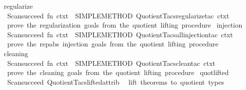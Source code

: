 \begin{isabellebody}
\isanewline
{}\isamarkupfalse%
\ regularize\ {\isacharequal}{\kern0pt}\isanewline
\ \ {\isacartoucheopen}Scan{\isachardot}{\kern0pt}succeed\ {\isacharparenleft}{\kern0pt}fn\ ctxt\ {\isacharequal}{\kern0pt}{\isachargreater}{\kern0pt}\ SIMPLE{\isacharunderscore}{\kern0pt}METHOD{\isacharprime}{\kern0pt}\ {\isacharparenleft}{\kern0pt}Quotient{\isacharunderscore}{\kern0pt}Tacs{\isachardot}{\kern0pt}regularize{\isacharunderscore}{\kern0pt}tac\ ctxt{\isacharparenright}{\kern0pt}{\isacharparenright}{\kern0pt}{\isacartoucheclose}\isanewline
\ \ {\isacartoucheopen}prove\ the\ regularization\ goals\ from\ the\ quotient\ lifting\ procedure{\isacartoucheclose}\isanewline
\isanewline
{}\isamarkupfalse%
\ injection\ {\isacharequal}{\kern0pt}\isanewline
\ \ {\isacartoucheopen}Scan{\isachardot}{\kern0pt}succeed\ {\isacharparenleft}{\kern0pt}fn\ ctxt\ {\isacharequal}{\kern0pt}{\isachargreater}{\kern0pt}\ SIMPLE{\isacharunderscore}{\kern0pt}METHOD{\isacharprime}{\kern0pt}\ {\isacharparenleft}{\kern0pt}Quotient{\isacharunderscore}{\kern0pt}Tacs{\isachardot}{\kern0pt}all{\isacharunderscore}{\kern0pt}injection{\isacharunderscore}{\kern0pt}tac\ ctxt{\isacharparenright}{\kern0pt}{\isacharparenright}{\kern0pt}{\isacartoucheclose}\isanewline
\ \ {\isacartoucheopen}prove\ the\ rep{\isacharslash}{\kern0pt}abs\ injection\ goals\ from\ the\ quotient\ lifting\ procedure{\isacartoucheclose}\isanewline
\isanewline
{}\isamarkupfalse%
\ cleaning\ {\isacharequal}{\kern0pt}\isanewline
\ \ {\isacartoucheopen}Scan{\isachardot}{\kern0pt}succeed\ {\isacharparenleft}{\kern0pt}fn\ ctxt\ {\isacharequal}{\kern0pt}{\isachargreater}{\kern0pt}\ SIMPLE{\isacharunderscore}{\kern0pt}METHOD{\isacharprime}{\kern0pt}\ {\isacharparenleft}{\kern0pt}Quotient{\isacharunderscore}{\kern0pt}Tacs{\isachardot}{\kern0pt}clean{\isacharunderscore}{\kern0pt}tac\ ctxt{\isacharparenright}{\kern0pt}{\isacharparenright}{\kern0pt}{\isacartoucheclose}\isanewline
\ \ {\isacartoucheopen}prove\ the\ cleaning\ goals\ from\ the\ quotient\ lifting\ procedure{\isacartoucheclose}\isanewline
\isanewline
{}\isamarkupfalse%
\ quot{\isacharunderscore}{\kern0pt}lifted\ {\isacharequal}{\kern0pt}\isanewline
\ \ {\isacartoucheopen}Scan{\isachardot}{\kern0pt}succeed\ Quotient{\isacharunderscore}{\kern0pt}Tacs{\isachardot}{\kern0pt}lifted{\isacharunderscore}{\kern0pt}attrib{\isacartoucheclose}\isanewline
\ \ {\isacartoucheopen}lift\ theorems\ to\ quotient\ types{\isacartoucheclose}%

\end{isabellebody}

